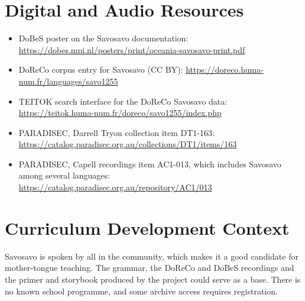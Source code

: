 \documentclass[12pt]{article}
\begin{document}
\section{Digital and Audio Resources}
\begin{itemize}
\item DoBeS poster on the Savosavo documentation: \url{https://dobes.mpi.nl/posters/print/oceania-savosavo-print.pdf}
\item DoReCo corpus entry for Savosavo (CC BY): \url{https://doreco.huma-num.fr/languages/savo1255}
\item TEITOK search interface for the DoReCo Savosavo data: \url{https://teitok.huma-num.fr/doreco/savo1255/index.php}
\item PARADISEC, Darrell Tryon collection item DT1-163: \url{https://catalog.paradisec.org.au/collections/DT1/items/163}
\item PARADISEC, Capell recordings item AC1-013, which includes Savosavo among several languages: \url{https://catalog.paradisec.org.au/repository/AC1/013}
\end{itemize}

\section{Curriculum Development Context}
Savosavo is spoken by all in the community, which makes it a good candidate for mother-tongue teaching. The grammar, the DoReCo and DoBeS recordings and the primer and storybook produced by the project could serve as a base. There is no known school programme, and some archive access requires registration.
\end{document}
